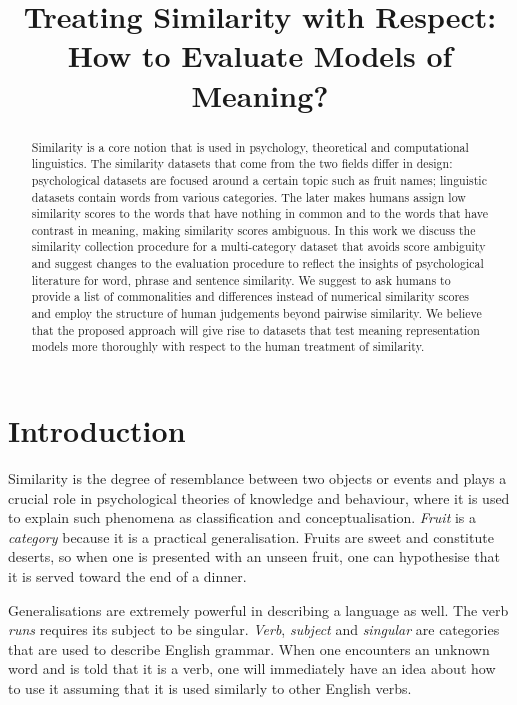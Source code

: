 \documentclass[11pt]{article}
\title{Treating Similarity with Respect: How to Evaluate Models of Meaning?}
\date{}
\begin{document}
\maketitle

\begin{abstract}
Similarity is a core notion that is used in psychology, theoretical and computational linguistics. The similarity datasets that come from the two fields differ in design: psychological datasets are focused around a certain topic such as fruit names; linguistic datasets contain words from various categories. The later makes humans assign low similarity scores to the words that have nothing in common and to the words that have contrast in meaning, making similarity scores ambiguous. In this work we discuss the similarity collection procedure for a multi-category dataset that avoids score ambiguity and suggest changes to the evaluation procedure to reflect the insights of psychological literature for word, phrase and sentence similarity. We suggest to ask humans to provide a list of commonalities and differences instead of numerical similarity scores and employ the structure of human judgements beyond pairwise similarity. We believe that the proposed approach will give rise to datasets that test meaning representation models more thoroughly with respect to the human treatment of similarity.
\end{abstract}

\section{Introduction}
\label{sec:introduction}

Similarity is the degree of resemblance between two objects or events \cite{WCS:WCS1282} and plays a crucial role in psychological theories of knowledge and behaviour, where it is used to explain such phenomena as classification and conceptualisation. \textit{Fruit} is a \emph{category} because it is a practical generalisation. Fruits are sweet and constitute deserts, so when one is presented with an unseen fruit, one can hypothesise that it is served toward the end of a dinner.

Generalisations are extremely powerful in describing a language as well. The verb \textit{runs} requires its subject to be singular. \textit{Verb}, \textit{subject} and \textit{singular} are categories that are used to describe English grammar. When one encounters an unknown word and is told that it is a verb, one will immediately have an idea about how to use it assuming that it is used similarly to other English verbs.
\end{document}
